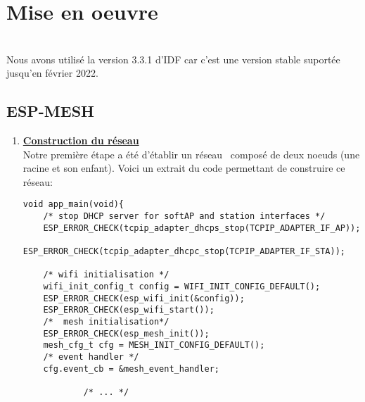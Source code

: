 \chapter{Mise en oeuvre}
    \\
    Nous avons utilisé la version 3.3.1 d'IDF car c'est une version stable suportée jusqu'en février 2022.
    \section{ESP-MESH}
    \begin{enumerate}
        \item \textbf{\underline{Construction du réseau}}\\
            Notre première étape a été d'établir un réseau \espmesh\ composé de deux noeuds (une racine et son enfant).
            Voici un extrait du code permettant de construire ce réseau:\newpage
            \begin{verbatim}
void app_main(void){
    /* stop DHCP server for softAP and station interfaces */
    ESP_ERROR_CHECK(tcpip_adapter_dhcps_stop(TCPIP_ADAPTER_IF_AP));
    ESP_ERROR_CHECK(tcpip_adapter_dhcpc_stop(TCPIP_ADAPTER_IF_STA));

    /* wifi initialisation */ 
    wifi_init_config_t config = WIFI_INIT_CONFIG_DEFAULT();
    ESP_ERROR_CHECK(esp_wifi_init(&config));
    ESP_ERROR_CHECK(esp_wifi_start());
    /*  mesh initialisation*/
    ESP_ERROR_CHECK(esp_mesh_init());
    mesh_cfg_t cfg = MESH_INIT_CONFIG_DEFAULT();
    /* event handler */
    cfg.event_cb = &mesh_event_handler;

            /* ... */
    

\end{verbatim}
\end{enumerate}
